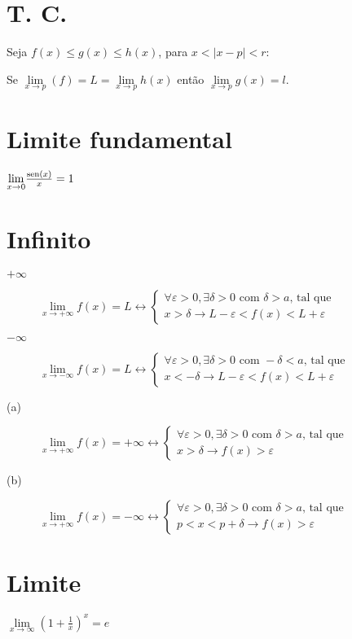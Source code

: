 \documentclass[11pt]{article}
\newcommand{\sen}{{\rm sen}}
\newcommand{\limit}[3]{{
  \underset{#1 \rightarrow #2}{\lim} #3
}}
\begin{document}
\section{T. C.}

Seja $f(x) \leq g(x) \leq h(x)$, para $x < |x-p|<r$:

Se $\limit{x}{p}{(f)} = L = \limit{x}{p}{h(x)}$ então $\limit{x}{p}{g(x)} = l$.

\section{Limite fundamental}

$\limit{x}{0}{\frac{\sen{(x)}}{x}} = 1$

\section{Infinito}

\begin{description}
  \item[$+\infty$]
  $
  \limit{x}{+\infty}{f(x)} = L \leftrightarrow
    \begin{cases}
      \forall \varepsilon > 0 , \exists \delta > 0\text{ com } \delta >a\text{,
tal que} \\
      x > \delta \to L - \varepsilon < f(x)<L+\varepsilon
    \end{cases}
  $

  \item[$-\infty$]
  $
  \limit{x}{-\infty}{f(x)} = L \leftrightarrow
    \begin{cases}
      \forall \varepsilon > 0 , \exists \delta > 0\text{ com } -\delta<a\text{,
tal que} \\
      x < -\delta \to L - \varepsilon < f(x)<L+\varepsilon
    \end{cases}
  $

  \item[(a)]
  $
  \limit{x}{+\infty}{f(x)} = +\infty \leftrightarrow
    \begin{cases}
      \forall \varepsilon > 0 , \exists \delta > 0\text{ com } \delta>a\text{,
tal que} \\
      x>\delta \to f(x) > \varepsilon
    \end{cases}
  $

  \item[(b)]
  $
  \limit{x}{+\infty}{f(x)} = -\infty \leftrightarrow
    \begin{cases}
      \forall \varepsilon > 0 , \exists \delta > 0\text{ com } \delta>a\text{,
tal que} \\
      p<x<p+\delta \to f(x) > \varepsilon
    \end{cases}
  $
\end{description}

\section{Limite}

$
\limit{x}{\infty}{(1+\frac{1}{x})^x} = e
$
\end{document}

